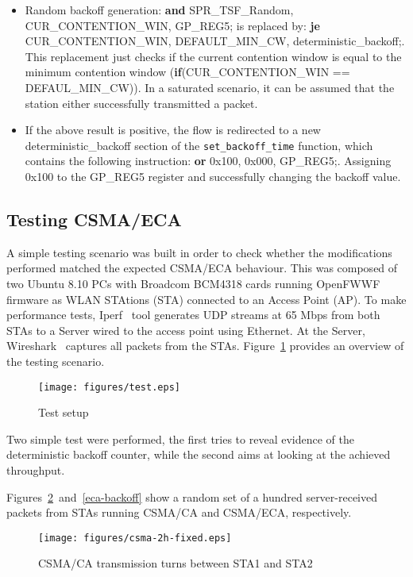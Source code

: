 \documentclass[conference]{IEEEtran}
\begin{document}
\begin{itemize}
	\item Random backoff generation: {\bf and} SPR\_TSF\_Random, CUR\_CONTENTION\_WIN, GP\_REG5; is replaced by: {\bf je} CUR\_CONTENTION\_WIN, DEFAULT\_MIN\_CW, deterministic\_backoff;. \\
	This replacement just checks if the current contention window is equal to the minimum contention window ({\bf if}(CUR\_CONTENTION\_WIN == DEFAUL\_MIN\_CW)). In a saturated scenario, it can be assumed that the station either successfully transmitted a packet.
	\item If the above result is positive, the flow is redirected to a new deterministic\_backoff section of the \texttt{set\_backoff\_time} function, which contains the following instruction: {\bf or} 0x100, 0x000, GP\_REG5;. Assigning 0x100 to the GP\_REG5 register and successfully changing the backoff value.
\end{itemize}

\subsection{Testing CSMA/ECA}
A simple testing scenario was built in order to check whether the modifications performed matched the expected CSMA/ECA behaviour. This was composed of two Ubuntu 8.10 PCs with Broadcom BCM4318 cards running OpenFWWF firmware as WLAN STAtions (STA) connected to an Access Point (AP). To make performance tests, Iperf~\cite{tirumala2005iperf} tool generates UDP streams at 65 Mbps from both STAs to a Server wired to the access point using Ethernet. At the Server, Wireshark~\cite{combs2007wireshark} captures all packets from the STAs. Figure~\ref{setup} provides an overview of the testing scenario.

\begin{figure}[htbp]
\centering
  \texttt{[image: figures/test.eps]}
  \caption{Test setup}
  \label{setup}
\end{figure}

Two simple test were performed, the first tries to reveal evidence of the deterministic backoff counter, while the second aims at looking at the achieved throughput. 

Figures~\ref{ca-backoff}~and~\ref{eca-backoff} show a random set of a hundred server-received packets from STAs running CSMA/CA and CSMA/ECA, respectively.

\begin{figure}[htbp]
\centering
  \texttt{[image: figures/csma-2h-fixed.eps]}
  \caption{CSMA/CA transmission turns between STA1 and STA2}
  \label{ca-backoff}
\end{figure}
\end{document}
